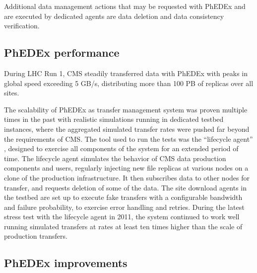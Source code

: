 Additional data management actions that may be requested with PhEDEx and are executed by dedicated agents are data deletion and data consistency verification.

\subsection{PhEDEx performance}


During LHC Run 1, CMS steadily transferred data with PhEDEx with peaks in global speed exceeding 5 GB/s, distributing more than 100 PB of replicas over all sites.


The scalability of PhEDEx as transfer management system was proven multiple times in the past with realistic simulations running in dedicated testbed instances, where the aggregated simulated transfer rates were pushed far beyond the requirements of CMS. The tool used to run the tests was the ``lifecycle agent'' \cite{lifecycle}, designed to exercise all components of the system for an extended period of time.
The lifecycle agent simulates the behavior of CMS data production components and users, regularly injecting new file replicas at various
nodes on a clone of the production infrastructure. It then subscribes data to other nodes for transfer, and requests deletion of some of the data.
The site download agents in the testbed are set up to execute fake transfers with a configurable bandwidth and failure probability, to exercise error handling and retries.
During the latest stress test with the lifecycle agent in 2011, the system continued to work well running simulated transfers at rates at least ten times higher than the scale of production transfers.


\subsection{PhEDEx improvements}

